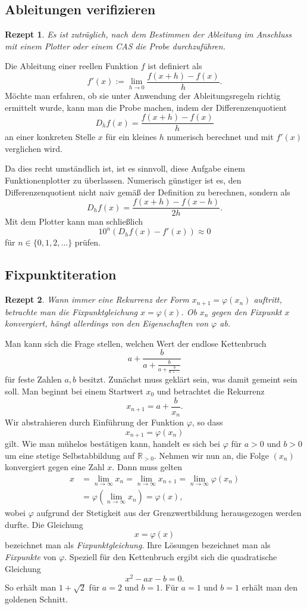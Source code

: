 \documentclass[a4paper,10pt,fleqn,twocolumn,twoside,dvipdfmx]{scrartcl}
\theoremstyle{rmbox}
\newtheorem{Rezept}{Rezept}[section]
\newcommand{\R}{\mathbb R}
\begin{document}
\subsection{Ableitungen verifizieren}

\begin{Rezept}
Es ist zuträglich, nach dem Bestimmen der Ableitung im Anschluss
mit einem Plotter oder einem CAS die Probe durchzuführen.
\end{Rezept}

\noindent
Die Ableitung einer reellen Funktion $f$ ist definiert als%
\[f'(x) := \lim_{h\to 0}\frac{f(x+h)-f(x)}{h}.\]
Möchte man erfahren, ob sie unter Anwendung
der Ableitungsregeln richtig ermittelt wurde, kann man die Probe
machen, indem der Differenzenquotient%
\[D_h f(x) = \frac{f(x+h)-f(x)}{h}\]
an einer konkreten Stelle $x$ für ein kleines $h$ numerisch
berechnet und mit $f'(x)$ verglichen wird.

Da dies recht umständlich ist, ist es sinnvoll, diese Aufgabe einem
Funktionenplotter zu überlassen. Numerisch günstiger ist es, den
Differenzenquotient nicht naiv gemäß der Definition zu berechnen,
sondern als%
\[D_h f(x) = \frac{f(x+h)-f(x-h)}{2h}.\]
Mit dem Plotter kann man schließlich
\[10^n (D_h f(x) - f'(x)) \approx 0\]
für $n\in\{0,1,2,\ldots\}$ prüfen.

\newpage
\subsection{Fixpunktiteration}

\begin{Rezept}
Wann immer eine Rekurrenz der Form $x_{n+1} = \varphi(x_n)$
auftritt, betrachte man die Fixpunktgleichung $x = \varphi(x)$. Ob
$x_n$ gegen den Fixpunkt $x$ konvergiert, hängt allerdings von den
Eigenschaften von $\varphi$ ab.
\end{Rezept}

\noindent
Man kann sich die Frage stellen, welchen Wert der endlose
Kettenbruch
\[a+\frac{b}{a+\frac{b}{a+\frac{b}{a+\ldots}}}\]
für feste Zahlen $a,b$ besitzt. Zunächst muss geklärt sein, was
damit gemeint sein soll. Man beginnt bei einem Startwert $x_0$
und betrachtet die Rekurrenz
\[x_{n+1} = a+\frac{b}{x_n}.\]
Wir abstrahieren durch Einführung der Funktion $\varphi$, so dass
\[x_{n+1} = \varphi(x_n)\]
gilt. Wie man mühelos bestätigen kann, handelt es sich bei $\varphi$
für $a>0$ und $b>0$ um eine stetige Selbstabbildung auf $\R_{>0}$.
Nehmen wir nun an, die Folge $(x_n)$ konvergiert gegen eine Zahl $x$.
Dann muss gelten
\begin{align*}
x &= \lim_{n\to\infty} x_{n} = \lim_{n\to\infty} x_{n+1}
= \lim_{n\to\infty}\varphi(x_n)\\
&= \varphi(\lim_{n\to\infty} x_n) = \varphi(x),
\end{align*}
wobei $\varphi$ aufgrund der Stetigkeit aus der Grenzwertbildung
herausgezogen werden durfte. Die Gleichung
\[x = \varphi(x)\]
bezeichnet man als \emph{Fixpunktgleichung}. Ihre Lösungen
bezeichnet man als \emph{Fixpunkte} von $\varphi$. Speziell für den
Kettenbruch ergibt sich die quadratische Gleichung
\[x^2 - ax - b = 0.\]
So erhält man $1+\sqrt{2}$ für $a=2$ und $b=1$.
Für $a=1$ und $b=1$ erhält man den goldenen Schnitt.
\end{document}
